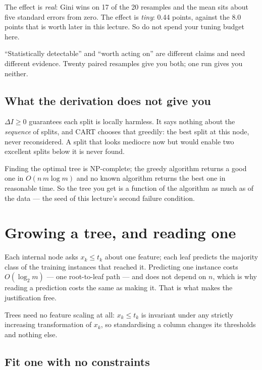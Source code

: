 \documentclass[11pt,a4paper]{article}
\begin{document}
\begin{keybox}[title={Three true statements, and only the third is a recommendation}]
The effect is \emph{real}: Gini wins on 17 of the 20 resamples and the mean
sits about five standard errors from zero. The effect is \emph{tiny}: 0.44
points, against the 8.0 points that  is worth later in this
lecture. So do not spend your tuning budget here.

``Statistically detectable'' and ``worth acting on'' are different claims and
need different evidence. Twenty paired resamples give you both; one run gives
you neither.
\end{keybox}

\subsection{What the derivation does not give you}

$\Delta I \ge 0$ guarantees each split is locally harmless. It says nothing
about the \emph{sequence} of splits, and CART chooses that greedily: the best
split at this node, never reconsidered. A split that looks mediocre now but
would enable two excellent splits below it is never found.

Finding the optimal tree is NP-complete; the greedy algorithm returns a good
one in $O(n\,m\log m)$ and no known algorithm returns the best one in
reasonable time. So the tree you get is a function of the algorithm as much as
of the data --- the seed of this lecture's second failure condition.

\section{Growing a tree, and reading one}

Each internal node asks $x_k \le t_k$ about one feature; each leaf predicts the
majority class of the training instances that reached it. Predicting one
instance costs $O(\log_2 m)$ --- one root-to-leaf path --- and does not depend
on $n$, which is why reading a prediction costs the same as making it. That is
what makes the justification free.

Trees need no feature scaling at all: $x_k \le t_k$ is invariant under any
strictly increasing transformation of $x_k$, so standardising a column changes
its thresholds and nothing else.

\subsection{Fit one with no constraints}
\end{document}
